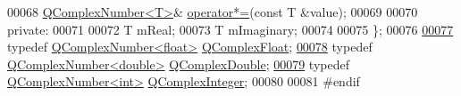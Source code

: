 \begin{DoxyCode}
00068         \hyperlink{a00021}{QComplexNumber<T>}& \hyperlink{a00021_a13c0aad5e700fe92eb9acf5fae669975}{operator*=}(\textcolor{keyword}{const} T &value);
00069 
00070     \textcolor{keyword}{private}:
00071 
00072         T mReal;
00073         T mImaginary;
00074 
00075 \};
00076 
\hypertarget{a00114_source_l00077}{}\hyperlink{a00114_ad957a9578f5201ba6cd85e0369965a0e}{00077} \textcolor{keyword}{typedef} \hyperlink{a00021}{QComplexNumber<float>} \hyperlink{a00114_ad957a9578f5201ba6cd85e0369965a0e}{QComplexFloat};
\hypertarget{a00114_source_l00078}{}\hyperlink{a00114_a0b0c28ad9b49b8db131d1b7a83d88b90}{00078} \textcolor{keyword}{typedef} \hyperlink{a00021}{QComplexNumber<double>} \hyperlink{a00114_a0b0c28ad9b49b8db131d1b7a83d88b90}{QComplexDouble};
\hypertarget{a00114_source_l00079}{}\hyperlink{a00114_ae575bcbda7093edc173011db3fce5000}{00079} \textcolor{keyword}{typedef} \hyperlink{a00021}{QComplexNumber<int>} \hyperlink{a00114_ae575bcbda7093edc173011db3fce5000}{QComplexInteger};
00080 
00081 \textcolor{preprocessor}{#endif}
\end{DoxyCode}
